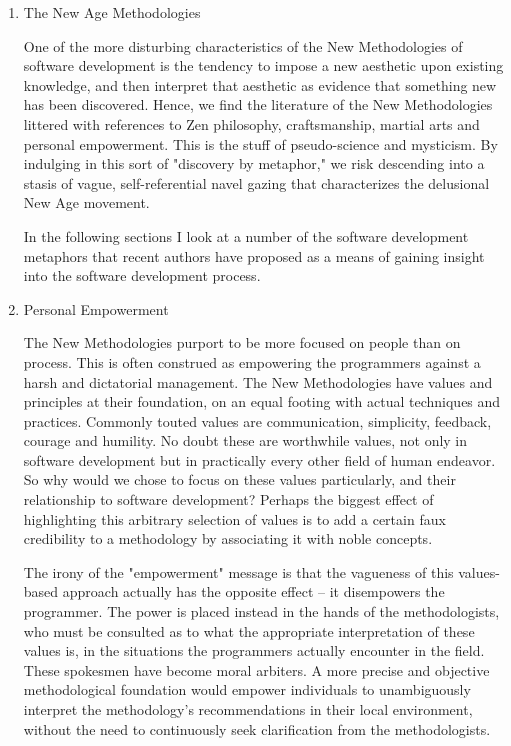 \documentclass{article}
\begin{document}
\begin{enumerate}
\item The New Age Methodologies
\label{sec:orgheadline198}

One of the more disturbing characteristics of the New Methodologies of
software development is the tendency to impose a new aesthetic upon
existing knowledge, and then interpret that aesthetic as evidence that
something new has been discovered. Hence, we find the literature of the
New Methodologies littered with references to Zen philosophy,
craftsmanship, martial arts and personal empowerment. This is the stuff
of pseudo-science and mysticism. By indulging in this sort of "discovery
by metaphor," we risk descending into a stasis of vague,
self-referential navel gazing that characterizes the delusional New Age
movement.

In the following sections I look at a number of the software development
metaphors that recent authors have proposed as a means of gaining
insight into the software development process.

\item Personal Empowerment
\label{sec:orgheadline199}

The New Methodologies purport to be more focused on people than on
process. This is often construed as empowering the programmers against a
harsh and dictatorial management. The New Methodologies have values and
principles at their foundation, on an equal footing with actual
techniques and practices. Commonly touted values are communication,
simplicity, feedback, courage and humility. No doubt these are
worthwhile values, not only in software development but in practically
every other field of human endeavor. So why would we chose to focus on
these values particularly, and their relationship to software
development? Perhaps the biggest effect of highlighting this arbitrary
selection of values is to add a certain faux credibility to a
methodology by associating it with noble concepts.

The irony of the "empowerment" message is that the vagueness of this
values-based approach actually has the opposite effect -- it disempowers
the programmer. The power is placed instead in the hands of the
methodologists, who must be consulted as to what the appropriate
interpretation of these values is, in the situations the programmers
actually encounter in the field. These spokesmen have become moral
arbiters. A more precise and objective methodological foundation would
empower individuals to unambiguously interpret the methodology's
recommendations in their local environment, without the need to
continuously seek clarification from the methodologists.


\end{enumerate}
\end{document}
